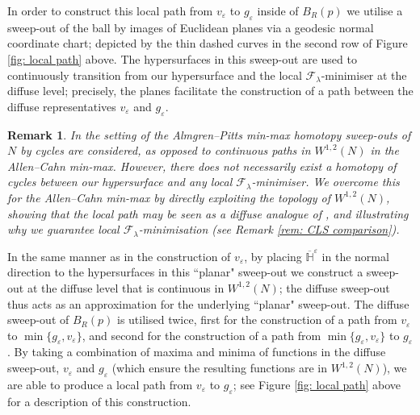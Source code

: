 \documentclass[11pt]{article}
\newtheorem{rem}{Remark}
\begin{document}
In order to construct this local path from $v_\varepsilon$ to $g_\varepsilon$ inside of $B_R(p)$ we utilise a sweep-out of the ball by images of Euclidean planes via a geodesic normal coordinate chart; depicted by the thin dashed curves in the second row of Figure \ref{fig: local path} above. The hypersurfaces in this sweep-out are used to continuously transition from our hypersurface and the local $\mathcal{F}_\lambda$-minimiser at the diffuse level; precisely, the planes facilitate the construction of a path between the diffuse representatives $v_\varepsilon$ and $g_\varepsilon$.

\begin{rem}
In the setting of the Almgren--Pitts min-max homotopy sweep-outs of $N$ by cycles are considered, as opposed to continuous paths in $W^{1,2}(N)$ in the Allen--Cahn min-max. However, there does not necessarily exist a homotopy of cycles between our hypersurface and any local $\mathcal{F}_\lambda$-minimiser. We overcome this for the Allen--Cahn min-max by directly exploiting the topology of $W^{1,2}(N)$, showing that the local path may be seen as a diffuse analogue of \cite[Lemma 1.12]{C-L-S}, and illustrating why we guarantee local $\mathcal{F}_\lambda$-minimisation (see Remark \ref{rem: CLS comparison}).
\end{rem}

In the same manner as in the construction of $v_\varepsilon$, by placing $\overline{\mathbb{H}}^\varepsilon$ in the normal direction to the hypersurfaces in this “planar" sweep-out we construct a sweep-out at the diffuse level that is continuous in $W^{1,2}(N)$; the diffuse sweep-out thus acts as an approximation for the underlying “planar" sweep-out. The diffuse sweep-out of $B_R(p)$ is utilised twice, first for the construction of a path from $v_\varepsilon$ to $\min\{g_\varepsilon,v_\varepsilon\}$, and second for the construction of a path from $\min\{g_\varepsilon,v_\varepsilon\}$ to $g_\varepsilon$. By taking a combination of maxima and minima of functions in the diffuse sweep-out, $v_\varepsilon$ and $g_\varepsilon$ (which ensure the resulting functions are in $W^{1,2}(N)$), we are able to produce a local path from $v_\varepsilon$ to $g_\varepsilon$; see Figure \ref{fig: local path} above for a description of this construction.

\bigskip
\end{document}

